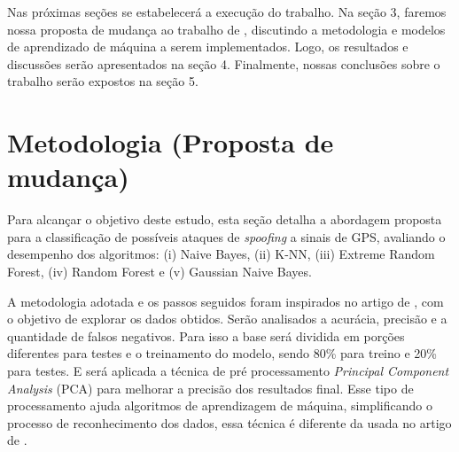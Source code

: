 \documentclass[12pt]{article}
\begin{document}
Nas próximas seções se estabelecerá a execução do trabalho. Na seção 3, faremos 
nossa proposta de mudança ao trabalho de \cite{Aissou2021}, discutindo a 
metodologia e modelos de aprendizado de máquina a
serem implementados. Logo, os resultados e 
discussões serão apresentados na seção 4. Finalmente, nossas conclusões sobre o 
trabalho serão expostos na seção 5.

\section{Metodologia (Proposta de mudança)}

Para alcançar o objetivo deste estudo, esta seção detalha a abordagem proposta para a classificação de possíveis ataques de \textit{spoofing} 
a sinais de GPS, avaliando o desempenho dos algoritmos: (i) Naive Bayes, (ii) K-NN, (iii) Extreme Random Forest, (iv) Random Forest e (v)  Gaussian Naive Bayes. 

A metodologia adotada e os passos seguidos foram inspirados no artigo de \cite{Aissou2021}, com o objetivo de explorar os dados obtidos. Serão analisados a acurácia, 
precisão e a quantidade de falsos negativos. 
Para isso a base será dividida em porções diferentes para testes e o treinamento do modelo, sendo 80\% para treino e 20\% para testes. E será aplicada a técnica de pré processamento 
\textit{Principal Component Analysis} (PCA) para melhorar a precisão dos resultados final. Esse tipo de processamento ajuda algoritmos de aprendizagem de máquina, simplificando o processo de reconhecimento dos dados, essa técnica é
diferente da usada no artigo de \cite{Aissou2021}.








\end{document}
